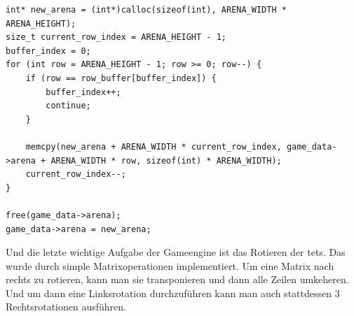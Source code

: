 \documentclass[11pt]{article}
\begin{document}
\vspace{10pt}
\begin{lstlisting}
int* new_arena = (int*)calloc(sizeof(int), ARENA_WIDTH * ARENA_HEIGHT);
size_t current_row_index = ARENA_HEIGHT - 1;
buffer_index = 0;
for (int row = ARENA_HEIGHT - 1; row >= 0; row--) {
    if (row == row_buffer[buffer_index]) {
        buffer_index++;
        continue;
    }

    memcpy(new_arena + ARENA_WIDTH * current_row_index, game_data->arena + ARENA_WIDTH * row, sizeof(int) * ARENA_WIDTH);
    current_row_index--;
}

free(game_data->arena);
game_data->arena = new_arena;
\end{lstlisting}

Und die letzte wichtige Aufgabe der Gameengine ist das Rotieren der \glspl{tet}. Das wurde durch simple Matrixoperationen implementiert.
Um eine Matrix nach rechts zu rotieren, kann man sie transponieren und dann alle Zeilen umkeheren.
Und um dann eine Linksrotation durchzuführen kann man auch stattdessen 3 Rechtsrotationen ausführen.
\end{document}
